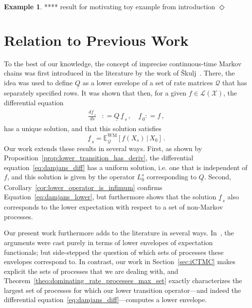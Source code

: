\documentclass[10pt]{paper}
\theoremstyle{definition}
\newtheorem{exmp}{Example}%
\newcommand{\states}{\mathcal{X}}
\newcommand{\gambles}{\mathcal{L}}
\newcommand{\gamblesX}{\gambles(\states)}
\newcommand{\rateset}{\mathcal{Q}}
\newcommand{\lrate}{\underline{Q}}
\newcommand{\coloneqq}{:\!=}
\newcommand{\exampleend}{\hfill$\Diamond$}
\begin{document}
\begin{exmp}
**** result for motivating toy example from introduction
\exampleend
\end{exmp}

\section{Relation to Previous Work}\label{sec:prev_work}

To the best of our knowledge, the concept of imprecise continuous-time Markov chains was first introduced in the literature by the work of {\v{S}}kulj~\cite{Skulj:2015cq}. There, the idea was used to define $\lrate$ as a lower envelope of a set of rate matrices $\rateset$ that has separately specified rows. It was shown that then, for a given $f\in\gamblesX$, the differential equation
\begin{align}\label{eq:damjans_diff}
\begin{split}
\frac{d \underline{f}_{\,s}}{d s} &\coloneqq \lrate\,\underline{f}_{\,s}\,,\quad
\underline{f}_{\,0} \coloneqq f\,,
\end{split}
\end{align}
has a unique solution, and that this solution satisfies
\begin{equation}\label{eq:damjans_lower}
\underline{f}_{\,s} = \underline{\mathbb{E}}_{\rateset}^{\mathrm{WM}}[f(X_s)\,\vert\,X_0]\,.
\end{equation}
Our work extends these results in several ways. First, as shown by Proposition~\ref{prop:lower_transition_has_deriv}, the differential equation~\eqref{eq:damjans_diff} has a uniform solution, i.e. one that is independent of $f$, and this solution is given by the operator $L_0^s$ corresponding to $\lrate$. Second, Corollary~\ref{cor:lower_operator_is_infimum} confirms Equation~\eqref{eq:damjans_lower}, but furthermore shows that the solution $\underline{f}_{\,s}$ also corresponds to the lower expectation with respect to a set of non-Markov processes.

Our present work furthermore adds to the literature in several ways. In~\cite{Skulj:2015cq}, the arguments were cast purely in terms of lower envelopes of expectation functionals; but side-stepped the question of which sets of processes these envelopes correspond to. In contrast, our work in Section~\ref{sec:iCTMC} makes explicit the sets of processes that we are dealing with, and Theorem~\ref{theo:dominating_rate_processes_max_set} exactly characterizes the largest set of processes for which our lower transition operator---and indeed the differential equation~\eqref{eq:damjans_diff}---computes a lower envelope.
\end{document}
